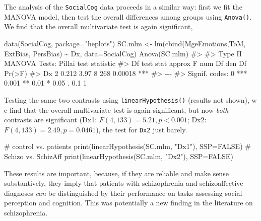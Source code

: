 \documentclass[
  letterpaper,
  10pt,
  krantz2]{krantz}
\makeatletter
\newenvironment{Shaded}{\begin{snugshade}}{\end{snugshade}}
\newcommand{\AttributeTok}[1]{\textcolor[rgb]{0.40,0.45,0.13}{#1}}
\newcommand{\CommentTok}[1]{\textcolor[rgb]{0.37,0.37,0.37}{#1}}
\newcommand{\ConstantTok}[1]{\textcolor[rgb]{0.56,0.35,0.01}{#1}}
\newcommand{\FunctionTok}[1]{\textcolor[rgb]{0.28,0.35,0.67}{#1}}
\newcommand{\NormalTok}[1]{\textcolor[rgb]{0.00,0.23,0.31}{#1}}
\newcommand{\OtherTok}[1]{\textcolor[rgb]{0.00,0.23,0.31}{#1}}
\newcommand{\SpecialCharTok}[1]{\textcolor[rgb]{0.37,0.37,0.37}{#1}}
\newcommand{\StringTok}[1]{\textcolor[rgb]{0.13,0.47,0.30}{#1}}
\newenvironment{kframe}{%
  \medskip{}
  \setlength{\fboxsep}{.8em}
  \def\at@end@of@kframe{}%
  \ifinner\ifhmode%
  \def\at@end@of@kframe{\end{minipage}}%
  \begin{minipage}{\columnwidth}%
  \fi\fi%
  \def\FrameCommand##1{\hskip\@totalleftmargin \hskip-\fboxsep
  \colorbox{shadecolor}{##1}\hskip-\fboxsep
      \hskip-\linewidth \hskip-\@totalleftmargin \hskip\columnwidth}%
  \MakeFramed {\advance\hsize-\width
    \@totalleftmargin\z@ \linewidth\hsize
    \@setminipage}}%
{\par\unskip\endMakeFramed%
  \at@end@of@kframe}
\renewenvironment{Shaded}{\begin{kframe}}{\end{kframe}}
\makeatother
\begin{document}
The analysis of the \texttt{SocialCog} data proceeds in a similar way:
first we fit the MANOVA model, then test the overall differences among
groups using \texttt{Anova()}. We find that the overall multivariate
test is again significant,

\begin{Shaded}
\begin{Highlighting}[]
\FunctionTok{data}\NormalTok{(SocialCog, }\AttributeTok{package=}\StringTok{"heplots"}\NormalTok{)}
\NormalTok{SC.mlm }\OtherTok{\textless{}{-}}  \FunctionTok{lm}\NormalTok{(}\FunctionTok{cbind}\NormalTok{(MgeEmotions,ToM, ExtBias, PersBias) }\SpecialCharTok{\textasciitilde{}}\NormalTok{ Dx,}
               \AttributeTok{data=}\NormalTok{SocialCog)}
\FunctionTok{Anova}\NormalTok{(SC.mlm)}
\CommentTok{\#\textgreater{} }
\CommentTok{\#\textgreater{} Type II MANOVA Tests: Pillai test statistic}
\CommentTok{\#\textgreater{}    Df test stat approx F num Df den Df  Pr(\textgreater{}F)    }
\CommentTok{\#\textgreater{} Dx  2     0.212     3.97      8    268 0.00018 ***}
\CommentTok{\#\textgreater{} {-}{-}{-}}
\CommentTok{\#\textgreater{} Signif. codes:  0 \textquotesingle{}***\textquotesingle{} 0.001 \textquotesingle{}**\textquotesingle{} 0.01 \textquotesingle{}*\textquotesingle{} 0.05 \textquotesingle{}.\textquotesingle{} 0.1 \textquotesingle{} \textquotesingle{} 1}
\end{Highlighting}
\end{Shaded}

Testing the same two contrasts using \texttt{linearHypothesis()}
(results not shown), w e find that the overall multivariate test is
again significant, but now \emph{both} contrasts are significant (Dx1:
\(F(4, 133)=5.21, p < 0.001\); Dx2: \(F(4, 133)=2.49, p = 0.0461\)), the
test for \texttt{Dx2} just barely.

\begin{Shaded}
\begin{Highlighting}[]
\CommentTok{\# control vs. patients}
\FunctionTok{print}\NormalTok{(}\FunctionTok{linearHypothesis}\NormalTok{(SC.mlm, }\StringTok{"Dx1"}\NormalTok{), }\AttributeTok{SSP=}\ConstantTok{FALSE}\NormalTok{)}
\CommentTok{\# Schizo vs. SchizAff}
\FunctionTok{print}\NormalTok{(}\FunctionTok{linearHypothesis}\NormalTok{(SC.mlm, }\StringTok{"Dx2"}\NormalTok{), }\AttributeTok{SSP=}\ConstantTok{FALSE}\NormalTok{)}
\end{Highlighting}
\end{Shaded}

These results are important, because, if they are reliable and make
sense substantively, they imply that patients with schizophrenia and
schizoaffective diagnoses \emph{can} be distinguished by their
performance on tasks assessing social perception and cognition. This was
potentially a new finding in the literature on schizophrenia.
\end{document}

